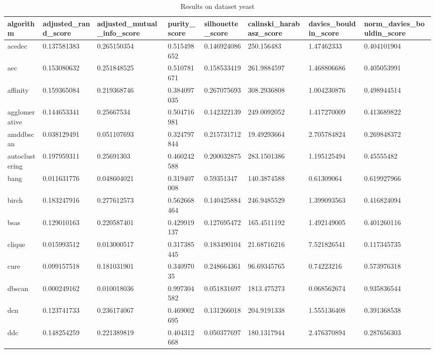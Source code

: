 \begin{table}[H]
\centering
\caption{Results on dataset yeast}
\label{S72_Table}
\begin{tabular}{|l|l|l|l|l|l|l|l|}
\hline
algorithm & adjusted\_rand\_score & adjusted\_mutual\_info\_score & purity\_score & silhouette\_score & calinski\_harabasz\_score & davies\_bouldin\_score & norm\_davies\_bouldin\_score \\
\hline
acedec & 0.137581383 & 0.265150354 & 0.515498652 & 0.146924086 & 250.156483 & 1.47462333 & 0.404101904 \\
\hline
aec & 0.153080632 & 0.251848525 & 0.510781671 & 0.158533419 & 261.9884597 & 1.468806686 & 0.405053991 \\
\hline
affinity & 0.159365084 & 0.219368746 & 0.384097035 & 0.267075693 & 308.2936808 & 1.004230876 & 0.498944514 \\
\hline
agglomerative & 0.144653341 & 0.25667534 & 0.504716981 & 0.142322139 & 249.0092052 & 1.417270009 & 0.413689822 \\
\hline
amddbscan & 0.038129491 & 0.051107693 & 0.324797844 & 0.215731712 & 19.49293664 & 2.705784824 & 0.269848372 \\
\hline
autoclustering & 0.197959311 & 0.25691303 & 0.460242588 & 0.200032875 & 283.1501386 & 1.195125494 & 0.45555482 \\
\hline
bang & 0.011631776 & 0.048604021 & 0.319407008 & 0.59351347 & 140.3874588 & 0.61309064 & 0.619927966 \\
\hline
birch & 0.183247916 & 0.277612573 & 0.562668464 & 0.140425884 & 246.9485529 & 1.399093563 & 0.416824094 \\
\hline
bsas & 0.129010163 & 0.220587401 & 0.429919137 & 0.127695472 & 165.4511192 & 1.492149005 & 0.401260116 \\
\hline
clique & 0.015993512 & 0.013000517 & 0.317385445 & 0.183490104 & 21.68716216 & 7.521826541 & 0.117345735 \\
\hline
cure & 0.099157518 & 0.181031901 & 0.34097035 & 0.248664361 & 96.69345765 & 0.74223216 & 0.573976318 \\
\hline
dbscan & 0.000249162 & 0.010018036 & 0.997304582 & 0.051831697 & 1813.475273 & 0.068562674 & 0.935836544 \\
\hline
dcn & 0.123741733 & 0.236174067 & 0.469002695 & 0.131266018 & 204.9191338 & 1.555136408 & 0.391368538 \\
\hline
ddc & 0.148254259 & 0.221389819 & 0.404312668 & 0.050377697 & 180.1317944 & 2.476370894 & 0.287656303 \\
\hline

\end{tabular}
\end{table}

